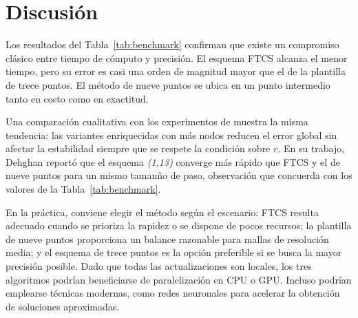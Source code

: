 \section{Discusi\'on}
Los resultados del Tabla~\ref{tab:benchmark} confirman que existe un compromiso cl\'asico entre tiempo de c\'omputo y precisi\'on. El esquema FTCS alcanza el menor tiempo, pero su error es casi una orden de magnitud mayor que el de la plantilla de trece puntos. El m\'etodo de nueve puntos se ubica en un punto intermedio tanto en costo como en exactitud.

Una comparaci\'on cualitativa con los experimentos de \citet{dehghan2002} muestra la misma tendencia: las variantes enriquecidas con m\'as nodos reducen el error global sin afectar la estabilidad siempre que se respete la condici\'on sobre $r$. En su trabajo, Dehghan report\'o que el esquema \emph{(1,13)} converge m\'as r\'apido que FTCS y el de nueve puntos para un mismo taman\~no de paso, observaci\'on que concuerda con los valores de la Tabla~\ref{tab:benchmark}.

En la pr\'actica, conviene elegir el m\'etodo seg\'un el escenario: FTCS resulta adecuado cuando se prioriza la rapidez o se dispone de pocos recursos; la plantilla de nueve puntos proporciona un balance razonable para mallas de resoluci\'on media; y el esquema de trece puntos es la opci\'on preferible si se busca la mayor precisi\'on posible. Dado que todas las actualizaciones son locales, los tres algoritmos podr\'ian beneficiarse de paralelizaci\'on en CPU o GPU. Incluso podr\'ian emplearse t\'ecnicas modernas, como redes neuronales para acelerar la obtenci\'on de soluciones aproximadas.
